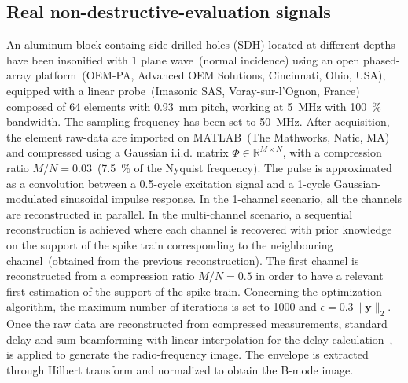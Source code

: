 \documentclass{article}
\newcommand{\vect}[1]{\bm{#1}}
\newcommand{\mat}[1]{\mathsf{#1}}
\theoremstyle{definition}
\begin{document}
\subsection{Real non-destructive-evaluation signals}
\label{subsec_invivo_images}
An aluminum block containg side drilled holes (SDH) located at different depths have been insonified with 1 plane wave~(normal incidence) using an open phased-array platform~(OEM-PA, Advanced OEM Solutions, Cincinnati, Ohio, USA), equipped with a linear probe~(Imasonic SAS, Voray-sur-l'Ognon, France) composed of \num{64} elements with \SI{0.93}{\milli\metre} pitch, working at \SI{5}{\mega\hertz} with \SI{100}{\percent} bandwidth. The sampling frequency has been set to \SI{50}{\mega\hertz}. 
After acquisition, the element raw-data are imported on MATLAB~(The Mathworks, Natic, MA) and compressed using a Gaussian i.i.d. matrix $\mat{\Phi} \in \mathbb{R}^{M \times N}$, with a compression ratio $M/N = 0.03$~(\SI{7.5}{\percent} of the Nyquist frequency). The pulse is approximated as a convolution between a \num{0.5}-cycle excitation signal and a \num{1}-cycle Gaussian-modulated sinusoidal impulse response. 
In the 1-channel scenario, all the channels are reconstructed in parallel. In the multi-channel scenario, a sequential reconstruction is achieved where each channel is recovered with prior knowledge on the support of the spike train corresponding to the neighbouring channel~(obtained from the previous reconstruction). The first channel is reconstructed from a compression ratio $M/N = 0.5$ in order to have a relevant first estimation of the support of the spike train. Concerning the optimization algorithm, the maximum number of iterations is set to \num{1000} and $\epsilon = 0.3 \| \vect{y} \|_2$. 
Once the raw data are reconstructed from compressed measurements, standard delay-and-sum beamforming with linear interpolation for the delay calculation~\cite{montaldo_uffc_2014}, is applied to generate the radio-frequency image. The envelope is extracted through Hilbert transform and normalized to obtain the B-mode image. 
\end{document}
